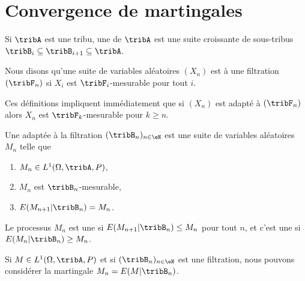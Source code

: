 
\section{Convergence de martingales}

\begin{definition}
	Si \( \tribA\) est une tribu, une  de \( \tribA\) est une suite croissante de sous-tribus \( \tribB_i\subseteq\tribB_{i+1}\subseteq\tribA\).

	Nous disons qu'une suite de variables aléatoires \( (X_n)\) est  à une filtration \( (\tribF_n)\) si \( X_i\) est \( \tribF_i\)-mesurable pour tout \( i\).
\end{definition}

Ces définitions impliquent immédiatement que si \( (X_n)\) est adapté à \( (\tribF_n)\) alors \( X_n\) est \( \tribF_k\)-mesurable pour \( k\geq n\).

\begin{definition}
	Une  adaptée à la filtration \( (\tribB_n)_{n\in \eN}\) est une suite de variables aléatoires \( M_n\) telle que
	\begin{enumerate}
		\item
		      \(M_n\in L^1(\Omega,\tribA,P)\),
		\item
		      \( M_n\) est \( \tribB_n\)-mesurable,
		\item
		      \( E(M_{n+1}|\tribB_n)=M_n\).
	\end{enumerate}

	Le processus \( M_n\) est une  si \( E(M_{n+1}|\tribB_n)\leq M_n\) pour tout \( n\), et c'est une  si \( E(M_n|\tribB_n)\geq M_n\).
\end{definition}

\begin{example}
	Si \( M\in L^1(\Omega,\tribA,P)\) et si \( (\tribB_n)_{n\in \eN}\) est une filtration, nous pouvons considérer la martingale \( M_n=E(M|\tribB_n)\).
\end{example}

